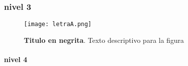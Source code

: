 		\subsubsection{nivel 3}
			
			\Blindtext

			\blindtext
			
			\begin{figure}[htb]
				\centering
				\texttt{[image: letraA.png]} %
				\caption[Titulo de la figura, este texto saldra en la lista de figuras]{\textbf{Titulo en negrita}. Texto descriptivo para la figura} 
				\label{fig:letraA}
			\end{figure}

			\paragraph{nivel 4}

				\blindtext
	
		
			